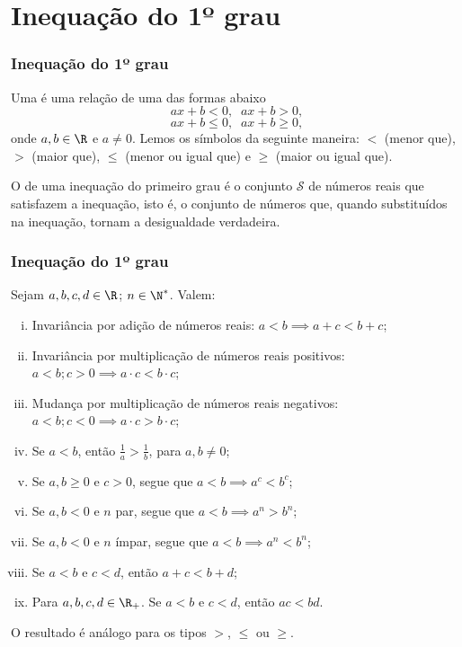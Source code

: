 
\section{Inequação do 1º grau}
\begin{frame}
\frametitle{Inequação do 1º grau} %

\begin{Def}
Uma  é uma relação de uma das formas
abaixo $$ax+b <0, \; \; ax+b>0,$$ $$ax+b \leq 0, \; \; ax+b \geq
0,$$ onde $a, b \in \R$ e $ a \neq 0$. Lemos os símbolos da seguinte
maneira: $<$ (menor que), $>$ (maior que), $\leq$ (menor ou igual
que) e $\geq$ (maior ou igual que).
\end{Def}

O  de uma inequação do primeiro grau é o
conjunto $\mathcal{S}$ de números reais que satisfazem a inequação,
isto é, o conjunto de números que, quando substituídos na inequação,
tornam a desigualdade verdadeira.

\end{frame}


\begin{frame}
\frametitle{Inequação do 1º grau} %

\begin{Prop}
Sejam $a, b, c, d \in \R$; $n \in \N^*$. Valem:
\begin{enumerate}[i.]
	\item Invariância por adição de números reais: $a < b \implies a+c < b+c$;
	\item Invariância por multiplicação de números reais positivos:
	$a < b ; c>0 \implies a \cdot c < b \cdot c$;
	\item Mudança por multiplicação de números reais
	negativos: $a < b ; c<0 \implies a \cdot c > b \cdot c$;
	\item Se $a < b$, então $\frac 1 a > \frac 1 b$, para $a, b \neq
	0$;
	\item Se $a,b \geq 0$ e $c>0$, segue que $a < b \implies a^c < b^c$;
	\item Se $a,b < 0$ e $n$ par, segue que $a < b \implies a^n > b^n$;
	\item Se $a,b < 0$ e $n$ ímpar, segue que $a < b \implies a^n <
	b^n$;
	\item Se $a< b$ e $c< d$, então $a+c < b+d$;
	\item Para $a, b, c, d \in \R_+$. Se $a< b$ e $c< d$, então $ac < bd$.
\end{enumerate}
O resultado é análogo para os tipos $>$, $\leq$ ou $\geq$.
\end{Prop}


\end{frame}


